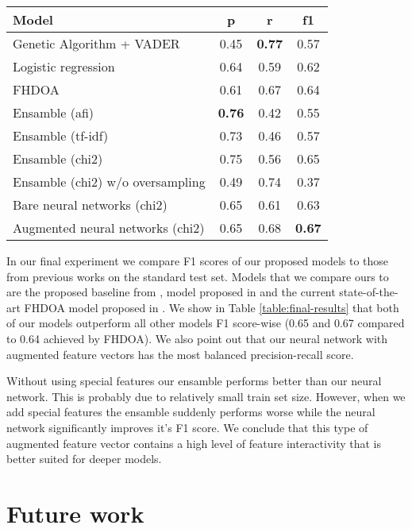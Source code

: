 \documentclass[10pt, a4paper]{article}
\begin{document}
\begin{table*}[htp]
\caption{Final results on test sets comparing to \cite{leiva2017towards},\cite{losada2016test} and \cite{losadaclef}\label{table:final-results}}
\begin{center}
\begin{tabular}{lccc}
\toprule
Model & p & r & f1\\
\midrule
Genetic Algorithm + VADER & 0.45 & \textbf{0.77} & 0.57\\
Logistic regression & 0.64 & 0.59 & 0.62\\
FHDOA & 0.61 & 0.67 & 0.64\\
Ensamble (afi) & \textbf{0.76} & 0.42 & 0.55\\
Ensamble (tf-idf) & 0.73 & 0.46 & 0.57\\
Ensamble (chi2) & 0.75 & 0.56 & 0.65\\
Ensamble (chi2) w/o oversampling & 0.49 & 0.74 & 0.37\\
Bare neural networks (chi2) & 0.65 & 0.61 & 0.63\\
Augmented neural networks (chi2) & 0.65 & 0.68 & \textbf{0.67}\\ 
\bottomrule
\end{tabular}
\end{center}
\end{table*}

In our final experiment we compare F1 scores of our proposed models to those from previous works on the standard test set.
 Models that we compare ours to are the proposed baseline from \cite{losada2016test}, model proposed in \cite{leiva2017towards}
 and the current state-of-the-art FHDOA model proposed in \cite{losadaclef}. We show in Table \ref{table:final-results} that both of
 our models outperform all other models F1 score-wise (0.65 and 0.67 compared to 0.64 achieved by FHDOA). We also point out that our
 neural network with augmented feature vectors has the most balanced precision-recall score.

 Without using special features our ensamble performs better than our neural network. This is probably due to relatively small
 train set size. However, when we add special features the ensamble suddenly performs worse while the neural network significantly improves
 it's F1 score. We conclude that this type of augmented feature vector contains a high level of feature interactivity that
 is better suited for deeper models.

\section{Future work}
\end{document}
